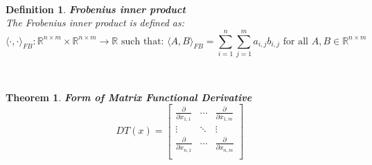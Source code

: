 \documentclass[12pt]{extarticle}
\theoremstyle{plain}
\newtheorem{thm}{Theorem}[section]
\theoremstyle{plain}
\theoremstyle{plain}
\theoremstyle{Definition}
\newtheorem{def.}{Definition}[section]
\theoremstyle{Definition}
\theoremstyle{plain}
\newcommand{\cut}[0]{\noindent\framebox[\linewidth]{\rule{\linewidth}{2pt}}\\}
\begin{document}
\cut
\begin{def.} \textbf{Frobenius inner product} \\
	The Frobenius inner product is defined as: \\ 
	$$\langle \cdot , \cdot \rangle_{FB} : \mathbb{R}^{n \times m} \times \mathbb{R}^{n \times m} \to \mathbb{R} \text{ such that: } \langle A,B \rangle_{FB} = \sum_{i=1}^n \sum_{j=1}^m a_{i,j}b_{i,j} \text{ for all } A,B \in \mathbb{R}^{n \times m}$$
\end{def.}
\cut
\begin{thm} \textbf{Form of Matrix Functional Derivative} \\
	\[
	DT(x) = 
	\begin{bmatrix}
	\frac{\partial}{\partial x_{1,1}} & \cdots & \frac{\partial}{\partial x_{1,m}} \\ 
	\vdots & \ddots & \vdots \\
	\frac{\partial}{\partial x_{n,1}} & \cdots & \frac{\partial}{\partial x_{n,m}} \\ 
	\end{bmatrix}	
	\]


\end{thm}
\cut
\end{document}
